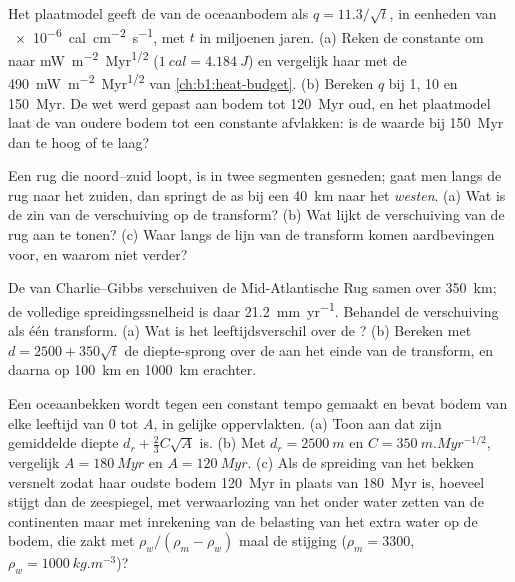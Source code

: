\begin{exercise}[$\star\star$]\label{exo:b1:rifts-ridges-margins:7}
Het plaatmodel geeft de  van de oceaanbodem als $q = 11.3/\sqrt t$, in eenheden van \qty{e-6}{cal.cm^{-2}.s^{-1}}, met $t$ in miljoenen jaren. (a) Reken de constante om naar \unit{mW.m^{-2}.Myr^{1/2}} ($\qty{1}{cal} =
\qty{4.184}{J}$) en vergelijk haar met de \qty{490}{mW.m^{-2}.Myr^{1/2}} van
\cref{ch:b1:heat-budget}. (b) Bereken $q$ bij 1, 10 en \qty{150}{Myr}. De wet werd gepast aan bodem tot \qty{120}{Myr} oud, en het plaatmodel laat de  van oudere bodem tot een constante afvlakken: is de waarde bij \qty{150}{Myr} dan te hoog of te laag?
\end{exercise}

\begin{exercise}[$\star\star$]\label{exo:b1:rifts-ridges-margins:8}
Een rug die noord--zuid loopt, is in twee segmenten gesneden; gaat men langs de rug naar het zuiden, dan springt de as bij een  \qty{40}{km} naar het \emph{westen}. (a) Wat is de zin van de verschuiving op de transform? (b) Wat lijkt de verschuiving van de rug aan te tonen? (c) Waar langs de lijn van de transform komen aardbevingen voor, en waarom niet verder?
\end{exercise}

\begin{exercise}[$\star\star$]\label{exo:b1:rifts-ridges-margins:9}
De  van Charlie--Gibbs verschuiven de Mid-Atlantische Rug samen over \qty{350}{km}; de volledige spreidingssnelheid is daar \qty{21.2}{mm.yr^{-1}}. Behandel de verschuiving als één transform. (a) Wat is het leeftijdsverschil over de ? (b) Bereken met $d = 2500 + 350\sqrt t$ de diepte-sprong over de  aan het einde van de transform, en daarna op \qty{100}{km} en \qty{1000}{km} erachter.
\end{exercise}

\begin{exercise}[$\star\star\star$]\label{exo:b1:rifts-ridges-margins:10}
Een oceaanbekken wordt tegen een constant tempo gemaakt en bevat bodem van elke leeftijd van 0 tot $A$, in gelijke oppervlakten. (a) Toon aan dat zijn gemiddelde diepte $d_r +
\frac23C\sqrt A$ is. (b) Met $d_r = \qty{2500}{m}$ en
$C = \qty{350}{m.Myr^{-1/2}}$, vergelijk $A = \qty{180}{Myr}$ en
$A = \qty{120}{Myr}$. (c) Als de spreiding van het bekken versnelt zodat haar oudste bodem \qty{120}{Myr} in plaats van \qty{180}{Myr} is, hoeveel stijgt dan de zeespiegel, met verwaarlozing van het onder water zetten van de continenten maar met inrekening van de belasting van het extra water op de bodem, die zakt met $\rho_w/(\rho_m - \rho_w)$ maal de stijging ($\rho_m = 3300$, $\rho_w = \qty{1000}{kg.m^{-3}}$)?
\end{exercise}

